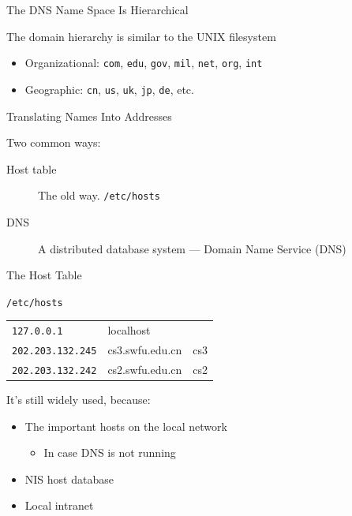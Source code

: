 \begin{frame}{The DNS Name Space Is Hierarchical}
  \begin{iblock}{The domain hierarchy is similar to the UNIX filesystem}
    \begin{center}
    \end{center}\label{fig:dns_tree}
  \end{iblock}
  \begin{itemize}
  \item Organizational: \texttt{com}, \texttt{edu}, \texttt{gov}, \texttt{mil}, \texttt{net},
    \texttt{org}, \texttt{int}
  \item Geographic: \texttt{cn}, \texttt{us}, \texttt{uk}, \texttt{jp}, \texttt{de}, etc.
  \end{itemize}
\end{frame}

\begin{frame}{Translating Names Into Addresses}
  \begin{iblock}{Two common ways:}
    \begin{description}
    \item[Host table] The old way. \texttt{/etc/hosts}
    \item[DNS] A distributed database system --- Domain Name Service (DNS)
    \end{description}
  \end{iblock}
\end{frame}

\begin{frame}{The Host Table}
  \begin{iblock}{\texttt{/etc/hosts}}
    \begin{center}
      \begin{tabular}{lll}
        \texttt{127.0.0.1}&localhost&\\
        \texttt{202.203.132.245}&cs3.swfu.edu.cn&cs3\\
        \texttt{202.203.132.242}&cs2.swfu.edu.cn&cs2
      \end{tabular}
    \end{center}
  \end{iblock}
  \begin{iblock}{It's still widely used, because:}
    \begin{itemize}
    \item The important hosts on the local network
      \begin{itemize}
      \item In case DNS is not running
      \end{itemize}
    \item NIS host database
    \item Local intranet
    \end{itemize}
  \end{iblock}
\end{frame}


